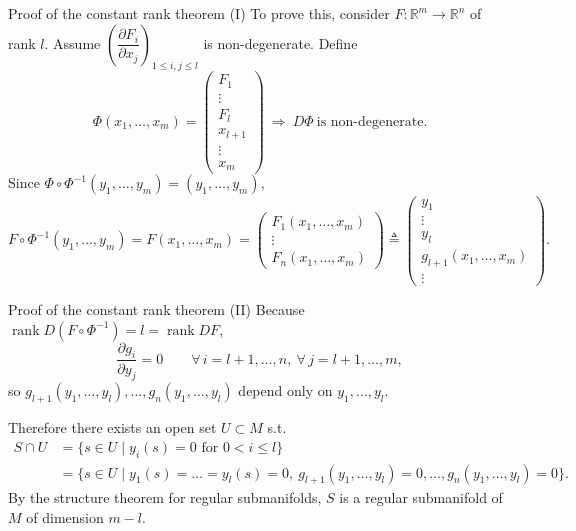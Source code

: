 \documentclass[10pt]{beamer}
\newcommand{\R}{\mathbb{R}}
\begin{document}
\begin{frame}{Proof of the constant rank theorem (I)}
	To prove this, consider $F : \R^m \to \R^n$ of rank $l$. Assume
	$\left( \dfrac{\partial F_i}{\partial x_j}
		\right)_{1 \le i, j \le l}$ is non-degenerate. Define
	\[
		\Phi(x_1, \dots, x_m) =
		\begin{pmatrix}
			F_1 \\ \vdots \\ F_l \\ x_{l+1} \\ \vdots \\ x_m
		\end{pmatrix}
		\ \Longrightarrow\
		D\Phi \ \text{is non-degenerate.}
	\]
	Since $\Phi \circ \Phi^{-1}(y_1, \dots, y_m) = (y_1, \dots, y_m)$,
	\[
		F \circ \Phi^{-1}(y_1, \dots, y_m)
		= F(x_1, \dots, x_m)
		= \begin{pmatrix}
			F_1(x_1, \dots, x_m) \\ \vdots \\ F_n(x_1, \dots, x_m)
		\end{pmatrix}
		\triangleq
		\begin{pmatrix}
			y_1 \\ \vdots \\ y_l \\ g_{l+1}(x_1, \dots, x_m) \\
			\vdots
		\end{pmatrix}.
	\]
\end{frame}

\begin{frame}{Proof of the constant rank theorem (II)}
	Because $\operatorname{rank} D(F \circ \Phi^{-1}) = l
		= \operatorname{rank} DF$,
	\[
		\frac{\partial g_i}{\partial y_j} = 0 \qquad
		\forall\, i = l+1, \dots, n,\ \forall\, j = l+1, \dots, m,
	\]
	so $g_{l+1}(y_1, \dots, y_l), \dots, g_n(y_1, \dots, y_l)$ depend
	only on $y_1, \dots, y_l$.
	\medskip

	Therefore there exists an open set $U \subset M$ s.t.
	\begin{align*}
		S \cap U
		 & = \{ s \in U \mid y_i(s) = 0 \text{ for } 0 < i \le l \} \\
		 & = \{ s \in U \mid y_1(s) = \dots = y_l(s) = 0, \
		g_{l+1}(y_1, \dots, y_l) = 0, \dots, g_n(y_1, \dots, y_l) = 0
		\}.
	\end{align*}
	By the structure theorem for regular submanifolds, $S$ is a
	regular submanifold of $M$ of dimension $m - l$. \qedhere
\end{frame}
\end{document}
